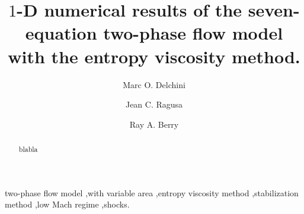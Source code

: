 \documentclass[preprint,10pt]{elsarticle}
\begin{document}
\begin{frontmatter}


\title{$1$-D numerical results of the seven-equation two-phase flow model with the entropy viscosity method.}
\author{Marc O. Delchini}

\author{Jean C. Ragusa}

\author{Ray A. Berry}

\address[label1]{Department of Nuclear Engineering, Texas A\&M University, College Station, TX 77843, USA }

\address[label2]{Idaho National Laboratory, Idaho Falls, ID 83415, USA }

\begin{abstract}
blabla
\end{abstract}
\begin{keyword}
  two-phase flow model \sep with variable area \sep entropy viscosity method \sep stabilization method \sep low Mach regime \sep shocks.
\end{keyword}
\end{frontmatter}
\linenumbers
\end{document}
